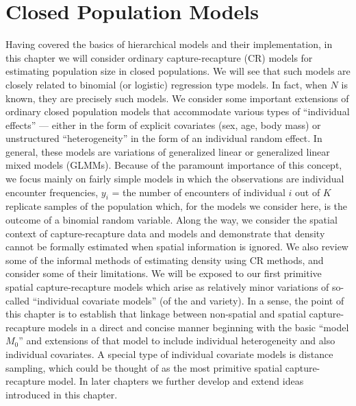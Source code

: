 \chapter{
 Closed Population Models
}
\label{chapt.closed}

\vspace{.3in}

Having covered the basics of hierarchical models and their implementation, 
in this chapter we will consider ordinary capture-recapture (CR)
models for estimating population size in closed populations. We will
see that such models are closely related to binomial (or logistic)
regression type models. In fact, when $N$ is known, they are precisely
such models.  We consider some important extensions of ordinary closed
population models that accommodate various types of ``individual
effects'' --- either in the form of explicit covariates (sex, age,
body mass) or unstructured ``heterogeneity'' in the form of an
individual random effect. In general, these models are variations of
generalized linear or generalized linear mixed models (GLMMs).
Because of the paramount importance of this concept, we focus mainly
on fairly simple models in which the observations are individual
encounter frequencies, $y_{i}$ = the number of encounters of
individual $i$ out of $K$ replicate samples of the population which,
for the models we consider here, is the outcome of a binomial random
variable.  Along the way, we consider the spatial context of
capture-recapture data and models and demonstrate that density cannot
be formally estimated when spatial information is ignored. We also
review some of the informal methods of estimating density using CR
methods, and consider some of their limitations.  We will be exposed
to our first primitive spatial capture-recapture models which arise as
relatively minor variations of so-called ``individual covariate
models'' (of the \citet{huggins:1989} and \citet{alho:1990}
variety). In a sense, the point of this chapter is to establish that
linkage  between non-spatial and spatial capture-recapture models 
 in a direct and concise manner beginning with the basic
``model $M_0$'' and extensions of that model to include individual
heterogeneity and also individual covariates. A special type of
individual covariate models is distance sampling, which could be
thought of as the most primitive spatial capture-recapture model.  In
later chapters we further develop and extend ideas introduced in this
chapter.

